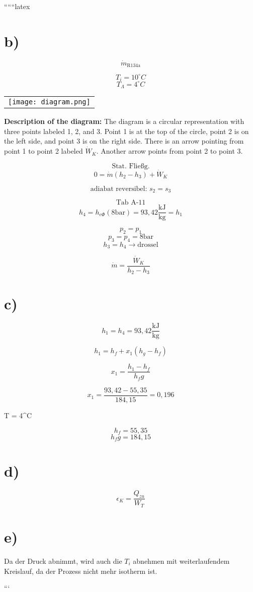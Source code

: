 ``````latex


\section*{b)}

\[
\dot{m}_{\text{R134a}}
\]

\[
T_i = 10^\circ C
\]
\[
T_{\Lambda} = 4^\circ C
\]

\begin{center}
\begin{tabular}{c}
\texttt{[image: diagram.png]}
\end{tabular}
\end{center}

\textbf{Description of the diagram:} The diagram is a circular representation with three points labeled 1, 2, and 3. Point 1 is at the top of the circle, point 2 is on the left side, and point 3 is on the right side. There is an arrow pointing from point 1 to point 2 labeled $\dot{W}_K$. Another arrow points from point 2 to point 3.

\[
\text{Stat. Fließg.}
\]
\[
0 = \dot{m} (h_2 - h_3) + \dot{W}_K
\]

\[
\text{adiabat reversibel: } s_2 = s_3
\]

\[
\text{Tab A-11}
\]
\[
h_4 = h_{e\Phi}(8 \text{bar}) = 93,42 \frac{\text{kJ}}{\text{kg}} = h_1
\]

\[
p_2 = p_1
\]
\[
p_3 = p_4 = 8 \text{bar}
\]
\[
h_3 = h_4 \rightarrow \text{drossel}
\]

\[
\dot{m} = \frac{\dot{W}_K}{h_2 - h_3}
\]

\section*{c)}

\[
h_1 = h_4 = 93,42 \frac{\text{kJ}}{\text{kg}}
\]

\[
h_1 = h_f + x_1 (h_g - h_f)
\]

\[
x_1 = \frac{h_1 - h_f}{h_fg}
\]

\[
x_1 = \frac{93,42 - 55,35}{184,15} = 0,196
\]

 \quad T = 4^\circ C

\[
h_f = 55,35
\]
\[
h_fg = 184,15
\]

\section*{d)}

\[
\epsilon_K = \frac{Q_{zu}}{W_T}
\]

\section*{e)}

Da der Druck abnimmt, wird auch die $T_i$ abnehmen mit weiterlaufendem Kreislauf, da der Prozess nicht mehr isotherm ist.

```